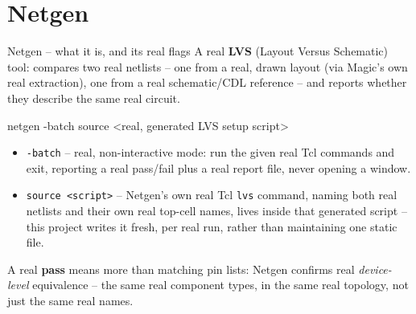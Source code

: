 \documentclass[aspectratio=169]{beamer}
\begin{document}
\section{Netgen}
\begin{frame}[fragile]{Netgen -- what it is, and its real flags}
A real \textbf{LVS} (Layout Versus Schematic) tool: compares two real
netlists -- one from a real, drawn layout (via Magic's own real
extraction), one from a real schematic/CDL reference -- and reports
whether they describe the same real circuit.
\begin{cli}
netgen -batch source <real, generated LVS setup script>
\end{cli}
\begin{itemize}
  \item \texttt{-batch} -- real, non-interactive mode: run the given
        real Tcl commands and exit, reporting a real pass/fail plus a
        real report file, never opening a window.
  \item \texttt{source <script>} -- Netgen's own real Tcl
        \texttt{lvs} command, naming both real netlists and their own
        real top-cell names, lives inside that generated script --
        this project writes it fresh, per real run, rather than
        maintaining one static file.
\end{itemize}
A real \textbf{pass} means more than matching pin lists: Netgen
confirms real \emph{device-level} equivalence -- the same real
component types, in the same real topology, not just the same real
names.
\end{frame}

\end{document}
